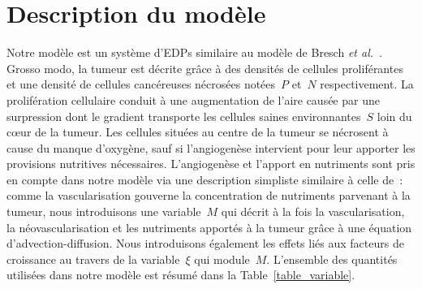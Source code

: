 \documentclass[11pt]{amsart}
\numberwithin{equation}{section}
\begin{document}
\section{Description du modèle}

Notre modèle est un système d'EDPs similaire au modèle de 
Bresch {\it et al.}~\cite{Bresch2010}. Grosso modo, la tumeur est décrite grâce à des densités de cellules proliférantes et une densité de cellules cancéreuses nécrosées notées~$P$ et~$N$ respectivement. 
La prolifération cellulaire conduit à une augmentation de l'aire causée par une surpression dont le gradient transporte les cellules saines environnantes~$S$ loin du c\oe{}ur de la tumeur. 
Les cellules situées au centre de la tumeur se nécrosent à cause du manque d'oxygène, sauf si l'angiogenèse intervient pour leur apporter les provisions nutritives nécessaires.
L'angiogenèse et l'apport en nutriments sont pris en compte dans notre modèle via une description simpliste similaire à celle de~\cite{Fathallah2013,Billy2009545}: comme la vascularisation gouverne la concentration de nutriments parvenant à la tumeur, nous introduisons une variable~$M$ 
qui décrit à la fois la vascularisation, la néovascularisation et les nutriments apportés à la tumeur grâce à une équation d'advection-diffusion. 
Nous introduisons également les effets liés aux facteurs de croissance au travers de la variable~$\xi$ qui module~$M$. L'ensemble des quantités utilisées dans notre modèle est résumé dans la  Table~\ref{table_variable}.
\end{document}
